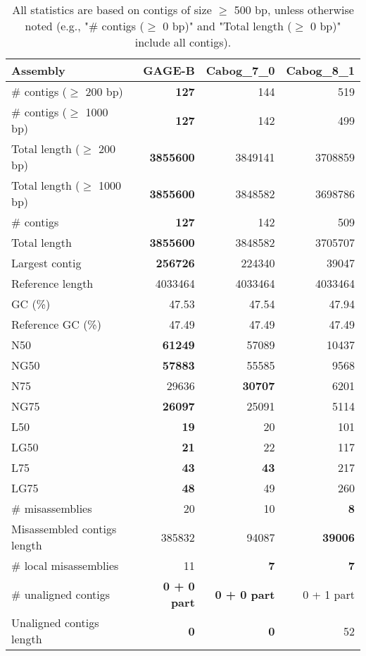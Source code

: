 \documentclass[12pt,a4paper]{article}
\begin{document}
\begin{table}[ht]
\begin{center}
\caption{All statistics are based on contigs of size $\geq$ 500 bp, unless otherwise noted (e.g., "\# contigs ($\geq$ 0 bp)" and "Total length ($\geq$ 0 bp)" include all contigs).}
\begin{tabular}{|l*{3}{|r}|}
\hline
Assembly & GAGE-B & Cabog\_7\_0 & Cabog\_8\_1 \\ \hline
\# contigs ($\geq$ 200 bp) & {\bf 127} & 144 & 519 \\ \hline
\# contigs ($\geq$ 1000 bp) & {\bf 127} & 142 & 499 \\ \hline
Total length ($\geq$ 200 bp) & {\bf 3855600} & 3849141 & 3708859 \\ \hline
Total length ($\geq$ 1000 bp) & {\bf 3855600} & 3848582 & 3698786 \\ \hline
\# contigs & {\bf 127} & 142 & 509 \\ \hline
Total length & {\bf 3855600} & 3848582 & 3705707 \\ \hline
Largest contig & {\bf 256726} & 224340 & 39047 \\ \hline
Reference length & 4033464 & 4033464 & 4033464 \\ \hline
GC (\%) & 47.53 & 47.54 & 47.94 \\ \hline
Reference GC (\%) & 47.49 & 47.49 & 47.49 \\ \hline
N50 & {\bf 61249} & 57089 & 10437 \\ \hline
NG50 & {\bf 57883} & 55585 & 9568 \\ \hline
N75 & 29636 & {\bf 30707} & 6201 \\ \hline
NG75 & {\bf 26097} & 25091 & 5114 \\ \hline
L50 & {\bf 19} & 20 & 101 \\ \hline
LG50 & {\bf 21} & 22 & 117 \\ \hline
L75 & {\bf 43} & {\bf 43} & 217 \\ \hline
LG75 & {\bf 48} & 49 & 260 \\ \hline
\# misassemblies & 20 & 10 & {\bf 8} \\ \hline
Misassembled contigs length & 385832 & 94087 & {\bf 39006} \\ \hline
\# local misassemblies & 11 & {\bf 7} & {\bf 7} \\ \hline
\# unaligned contigs & {\bf 0 + 0 part} & {\bf 0 + 0 part} & 0 + 1 part \\ \hline
Unaligned contigs length & {\bf 0} & {\bf 0} & 52 \\ \hline

\end{tabular}
\end{center}
\end{table}
\end{document}

